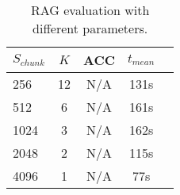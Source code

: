 \begin{table*}[ht!]
    \centering
    \begin{tabular}{lc|ccc}
      \toprule
      $S_{chunk}$ & $K$ & ACC & $t_{mean}$ \\
      \midrule
      256  & 12 & N/A & 131s \\
      512  & 6  & N/A & 161s \\
      1024 & 3  & N/A & 162s \\
      2048 & 2  & N/A & 115s \\
      4096 & 1  & N/A & 77s \\
      \bottomrule
    \end{tabular}
    \caption{RAG evaluation with different parameters.}
    \label{tab:RAG_evaluation}
  \end{table*}
  